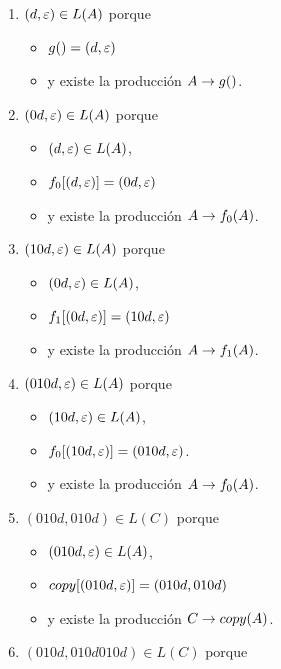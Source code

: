 \begin{enumerate}
    \item $(d, \varepsilon) \in L(A)$ porque
          \begin{itemize}
              \item $g() = (d, \varepsilon)$
              \item y existe la producción $A \rightarrow g()$.
          \end{itemize}

    \item $(0d, \varepsilon) \in L(A)$ porque
          \begin{itemize}
              \item $(d, \varepsilon) \in L(A)$,
              \item $f_0[(d, \varepsilon)] = (0d, \varepsilon)$
              \item y existe la producción $A \rightarrow f_0(A)$.
          \end{itemize}
    \item $(10d, \varepsilon) \in L(A)$ porque
          \begin{itemize}
              \item $(0d, \varepsilon) \in L(A)$,
              \item $f_1[(0d, \varepsilon)] = (10d, \varepsilon)$
              \item y existe la producción $A \rightarrow f_1(A)$.
          \end{itemize}
    \item $(010d, \varepsilon) \in L(A)$ porque
          \begin{itemize}
              \item $(10d, \varepsilon) \in L(A)$,
              \item $f_0[(10d, \varepsilon)] = (010d, \varepsilon)$.
              \item y existe la producción $A \rightarrow f_0(A)$.
          \end{itemize}
    \item $(010d, 010d) \in L(C)$ porque
          \begin{itemize}
              \item $(010d, \varepsilon) \in L(A)$,
              \item $copy[(010d, \varepsilon)] = (010d, 010d)$
              \item y existe la producción $C \rightarrow copy(A)$.
          \end{itemize}
    \item $(010d, 010d010d) \in L(C)$ porque
          \begin{itemize}

\end{itemize}
\end{enumerate}
